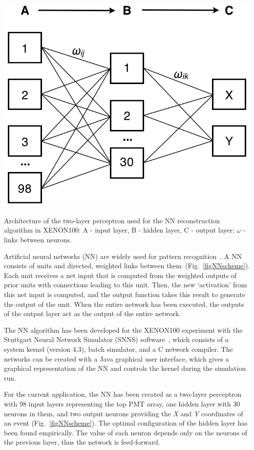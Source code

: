 \begin{floatingfigure}[r]{0.4\textwidth}
\centering
\includegraphics[width=0.4\linewidth]{plots/NN/NNscheme_withWeightsAndArrows.png}
\caption[Architecture of the two-layer perceptron used for the NN reconstruction algorithm in XENON100]{Architecture of the two-layer perceptron used for the NN reconstruction algorithm in XENON100: A - input layer, B - hidden layer, C - output layer; $\omega$ - links between neurons.}
\label{figNNscheme}
\end{floatingfigure}

Artificial neural networks (NN) are widely used for pattern recognition~\cite{PatternRecognition}. A NN consists of units and directed, weighted links between them~(Fig.~\ref{figNNscheme}). Each unit receives a net input that is computed from the weighted outputs of prior units with connections leading to this unit. Then, the new `activation' from this net input is computed, and the output function takes this result to generate the output of the unit. When the entire network has been executed, the outputs of the output layer act as the output of the entire network. 

The NN algorithm has been developed for the XENON100 experiment with the Stuttgart Neural Network Simulator (SNNS) software~\cite{SNNS}, which consists of a system kernel (version 4.3), batch simulator, and a C network compiler. The networks can be created with a Java graphical user interface, which gives a graphical representation of the NN and controls the kernel during the simulation run.

For the current application, the NN has been created as a two-layer perceptron~\cite{Perceptron} with 98 input layers representing the top PMT array, one hidden layer with 30 neurons in them, and two output neurons providing the {\it X} and {\it Y} coordinates of an event (Fig.~\ref{figNNscheme}). The optimal configuration of the hidden layer has been found empirically. The value of each neuron depends only on the neurons of the previous layer, thus the network is feed-forward.

